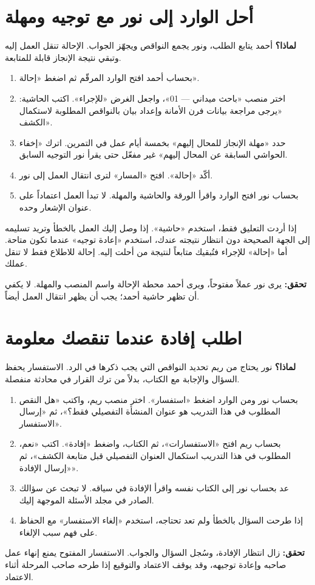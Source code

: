 \section{أحل الوارد إلى نور مع توجيه ومهلة}
\label{sec:refer}
\textbf{لماذا؟} أحمد يتابع الطلب، ونور يجمع النواقص ويجهّز الجواب. الإحالة تنقل العمل إليه وتبقي نتيجة الإنجاز قابلة للمتابعة.
\begin{enumerate}
\item بحساب أحمد افتح الوارد المرقّم ثم اضغط «إحالة».
\item اختر منصب «باحث ميداني — 01»، واجعل الغرض «للإجراء». اكتب الحاشية: «يرجى مراجعة بيانات فرن الأمانة وإعداد بيان بالنواقص المطلوبة لاستكمال الكشف».
\item حدد «مهلة الإنجاز للمحال إليهم» بخمسة أيام عمل في التمرين. اترك «إخفاء الحواشي السابقة عن المحال إليهم» غير مفعّل حتى يقرأ نور التوجيه السابق.
\item أكّد «إحالة». افتح «المسار» لترى انتقال العمل إلى نور.
\item بحساب نور افتح الوارد واقرأ الورقة والحاشية والمهلة. لا تبدأ العمل اعتماداً على عنوان الإشعار وحده.
\end{enumerate}
\begin{rcnote}
إذا أردت التعليق فقط، استخدم «حاشية». إذا وصل إليك العمل بالخطأ وتريد تسليمه إلى الجهة الصحيحة دون انتظار نتيجته عندك، استخدم «إعادة توجيه» عندما تكون متاحة. أما «إحالة» للإجراء فتُبقيك متابعاً لنتيجة من أحلت إليه. إحالة للاطلاع فقط لا تنقل عملك.
\end{rcnote}
\textbf{تحقق:} يرى نور عملاً مفتوحاً، ويرى أحمد محطة الإحالة واسم المنصب والمهلة. لا يكفي أن تظهر حاشية أحمد؛ يجب أن يظهر انتقال العمل أيضاً.

\section{اطلب إفادة عندما تنقصك معلومة}
\label{sec:inquiry}
\textbf{لماذا؟} نور يحتاج من ريم تحديد النواقص التي يجب ذكرها في الرد. الاستفسار يحفظ السؤال والإجابة مع الكتاب، بدلاً من ترك القرار في محادثة منفصلة.
\begin{enumerate}
\item بحساب نور ومن الوارد اضغط «استفسار». اختر منصب ريم، واكتب «هل النقص المطلوب في هذا التدريب هو عنوان المنشأة التفصيلي فقط؟»، ثم «إرسال الاستفسار».
\item بحساب ريم افتح «الاستفسارات»، ثم الكتاب، واضغط «إفادة». اكتب «نعم، المطلوب في هذا التدريب استكمال العنوان التفصيلي قبل متابعة الكشف»، ثم «إرسال الإفادة».
\item عد بحساب نور إلى الكتاب نفسه واقرأ الإفادة في سياقه. لا تبحث عن سؤالك الصادر في مجلد الأسئلة الموجهة إليك.
\item إذا طرحت السؤال بالخطأ ولم تعد تحتاجه، استخدم «إلغاء الاستفسار» مع الحفاظ على فهم سبب الإلغاء.
\end{enumerate}
\textbf{تحقق:} زال انتظار الإفادة، وسُجل السؤال والجواب. الاستفسار المفتوح يمنع إنهاء عمل صاحبه وإعادة توجيهه، وقد يوقف الاعتماد والتوقيع إذا طرحه صاحب المرحلة أثناء الاعتماد.


